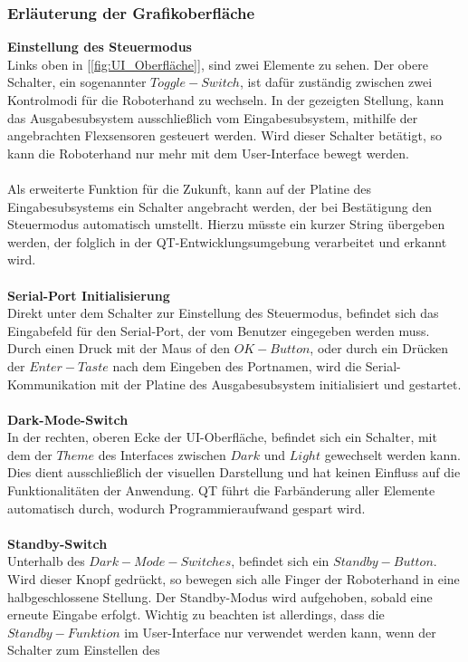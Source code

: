 \documentclass[titlepage,12pt,twoside]{article}
\begin{document}
\subsubsection{Erläuterung der Grafikoberfläche}
\textbf{Einstellung des Steuermodus} \\
Links oben in [\textcolor{blue}{\autoref{fig:UI_Oberfläche}}], sind zwei Elemente zu sehen. Der obere Schalter, ein sogenannter $Toggle-Switch$, ist dafür zuständig
zwischen zwei Kontrolmodi für die Roboterhand zu wechseln. In der gezeigten Stellung, kann das Ausgabesubsystem ausschließlich vom Eingabesubsystem,
mithilfe der angebrachten Flexsensoren gesteuert werden. Wird dieser Schalter betätigt, so kann die Roboterhand nur mehr mit dem User-Interface
bewegt werden. \\
\\
Als erweiterte Funktion für die Zukunft, kann auf der Platine des Eingabesubsystems ein Schalter angebracht werden, der bei Bestätigung
den Steuermodus automatisch umstellt. Hierzu müsste ein kurzer String übergeben werden, der folglich in der QT-Entwicklungsumgebung verarbeitet
und erkannt wird. \\
\\
\textbf{Serial-Port Initialisierung} \\
Direkt unter dem Schalter zur Einstellung des Steuermodus, befindet sich das Eingabefeld für den Serial-Port, der vom Benutzer eingegeben werden muss. Durch 
einen Druck mit der Maus of den $OK-Button$, oder durch ein Drücken der $Enter-Taste$ nach dem Eingeben des Portnamen, wird die Serial-Kommunikation mit der Platine des Ausgabesubsystem 
initialisiert und gestartet. \\
\\
\textbf{Dark-Mode-Switch} \\
In der rechten, oberen Ecke der UI-Oberfläche, befindet sich ein Schalter, mit dem der $Theme$ des Interfaces zwischen $Dark$ und $Light$ gewechselt werden kann. Dies dient ausschließlich der 
visuellen Darstellung und hat keinen Einfluss auf die Funktionalitäten der Anwendung. QT führt die Farbänderung aller Elemente automatisch durch, wodurch Programmieraufwand gespart wird. \\
\\
\textbf{Standby-Switch} \\
Unterhalb des $Dark-Mode-Switches$, befindet sich ein $Standby-Button$. Wird dieser Knopf gedrückt, so bewegen sich alle Finger der Roboterhand in eine halbgeschlossene Stellung. Der Standby-Modus
wird aufgehoben, sobald eine erneute Eingabe erfolgt. Wichtig zu beachten ist allerdings, dass die $Standby-Funktion$ im User-Interface nur verwendet werden kann, wenn der Schalter zum Einstellen des 
\end{document}
